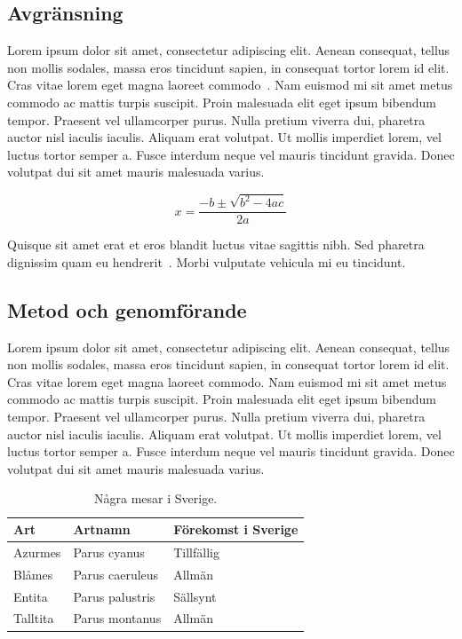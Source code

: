 \documentclass[11pt,a4paper]{article}
\begin{document}
\subsection{Avgränsning}
Lorem ipsum dolor sit amet, consectetur adipiscing elit. Aenean
consequat, tellus non mollis sodales, massa eros tincidunt sapien, in
consequat tortor lorem id elit. Cras vitae lorem eget magna laoreet
commodo~\cite{bib:mattson.2008}. Nam euismod mi sit amet metus commodo
ac mattis turpis suscipit. Proin malesuada elit eget ipsum bibendum
tempor. Praesent vel ullamcorper purus. Nulla pretium viverra dui,
pharetra auctor nisl iaculis iaculis. Aliquam erat volutpat. Ut mollis
imperdiet lorem, vel luctus tortor semper a. Fusce interdum neque vel
mauris tincidunt gravida. Donec volutpat dui sit amet mauris malesuada
varius.

\begin{equation}
  x=\frac{-b\pm \sqrt{b^2-4ac}}{2a}
\end{equation}

Quisque sit amet erat et eros blandit luctus vitae sagittis nibh. Sed
pharetra dignissim quam eu hendrerit~\cite{bib:persson.2010.01}. Morbi
vulputate vehicula mi eu tincidunt.



\subsection{Metod och genomförande}
Lorem ipsum dolor sit amet, consectetur adipiscing elit. Aenean
consequat, tellus non mollis sodales, massa eros tincidunt sapien, in
consequat tortor lorem id elit. Cras vitae lorem eget magna laoreet
commodo. Nam euismod mi sit amet metus commodo ac mattis turpis
suscipit. Proin malesuada elit eget ipsum bibendum tempor. Praesent
vel ullamcorper purus. Nulla pretium viverra dui, pharetra auctor nisl
iaculis iaculis. Aliquam erat volutpat. Ut mollis imperdiet lorem, vel
luctus tortor semper a. Fusce interdum neque vel mauris tincidunt
gravida. Donec volutpat dui sit amet mauris malesuada varius.

\begin{table}[hbt]
  \begin{center}
    \caption{Några mesar i Sverige.}
    \label{mesar}
    \begin{tabular}{|l|l|l|}
      \hline
      Art      & Artnamn         & Förekomst i Sverige \\
      \hline
      Azurmes  & Parus cyanus    & Tillfällig \\
      \hline
      Blåmes   & Parus caeruleus & Allmän \\
      \hline
      Entita   & Parus palustris & Sällsynt \\ 
      \hline
      Talltita & Parus montanus  & Allmän \\
      \hline
    \end{tabular}
  \end{center}
\end{table}
\end{document}
